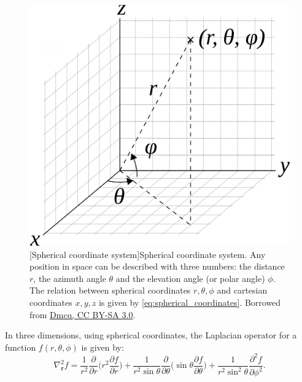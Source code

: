 \begin{figure}[t]
    \begin{center}
    \includegraphics[width=0.4\linewidth]{Images/chap2/spherical_coordinates.png}
    [Spherical coordinate system]{Spherical coordinate system. Any position in space can be described with three numbers: the distance $r$, the azimuth angle $\theta$ and the elevation angle (or polar angle) $\phi$. The relation between spherical coordinates $r,\theta, \phi$ and cartesian coordinates $x,y,z$ is given by \eqref{eq:spherical_coordinates}. Borrowed from \href{https://commons.wikimedia.org/wiki/File:3D_Spherical_2.svg}{Dmcq, CC BY-SA 3.0}.}
    \label{fig:spherical_coordinates}
    \end{center}
\end{figure}

In three dimensions, using spherical coordinates, the Laplacian operator for a function $f(r,\theta,\phi)$ is given by:
\begin{equation}
\label{eq:sphericalLaplacian}
    \nabla_\mathbf{r}^2 f = \frac{1}{r^2} \frac{\partial}{\partial r} \bigg(r^2 \frac{\partial f}{\partial r} \bigg) + \frac{1}{r^2 \sin\theta} \frac{\partial}{\partial \theta} \bigg(\sin\theta \frac{\partial f}{\partial \theta} \bigg) + \frac{1}{r^2 \sin^2 \theta} \frac{\partial^2 f}{\partial \phi^2}.
\end{equation}

